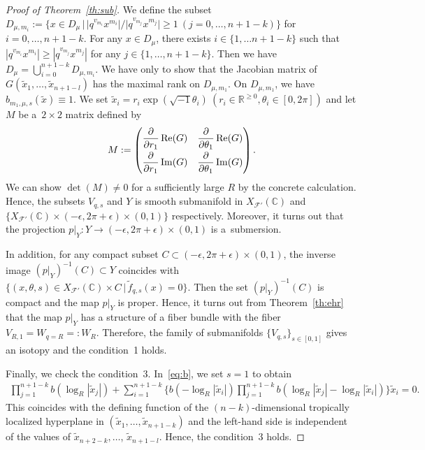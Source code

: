 \documentclass[10pt,a4paper]{amsart}
\numberwithin{equation}{section}
\begin{document}
\begin{proof}[Proof of Theorem~\ref{th:sub}]
We def\/ine the subset $D_{\mu,m_i}:=\{ x \in D_{\mu} \,|\, |q^{v_{m_i}}x^{m_i}|/|q^{v_{m_j}}x^{m_j}| \geq1\ (j=0, \dots, n+1-k) \}$ for $i=0, \dots, n+1-k$. For any $x \in D_\mu$, there exists $i \in \{1, \dots n+1-k\}$ such that $|q^{v_{m_i}}x^{m_i}| \geq |q^{v_{m_j}}x^{m_j}|$ for any $j \in \{1, \dots, n+1-k\}$.
Then we have $D_{\mu} = \bigcup_{i=0}^{n+1-k} D_{\mu,m_i}$. We have only to show that the Jacobian matrix of $G(\tilde{x}_1, \dots, \tilde{x}_{n+1-l})$ has the maximal rank on $D_{\mu,{m_1}}$. On $D_{\mu,{m_1}}$, we have $b_{m_1,\mu,s}(\tilde{x}) \equiv 1$. We set $\tilde{x}_i=r_i\exp(\sqrt{-1} \theta_i)\ (r_i \in {\mathbb R}^{\geq0}, \theta_i \in [0,2\pi])$ and let $M$ be a~$2 \times 2$ matrix def\/ined by
\begin{gather*}
M:=\begin{pmatrix}
\dfrac{\partial}{\partial r_{1}} \operatorname{Re}(G) &\dfrac{\partial}{\partial \theta_{1}} \operatorname{Re}(G)\vspace{1mm}\\
\dfrac{\partial}{\partial r_{1}} \operatorname{Im}(G) &\dfrac{\partial}{\partial \theta_{1}} \operatorname{Im}(G)
\end{pmatrix}.
\end{gather*}
We can show $\det(M) \neq 0$ for a suf\/f\/iciently large $R$ by the concrete calculation. Hence, the subsets $V_{q,s}$ and $Y$ is smooth submanifold in $X_{{\mathcal F}'}({\mathbb C})$ and $\{X_{{\mathcal F}'}({\mathbb C}) \times (-\epsilon, 2\pi+\epsilon) \times (0,1)\}$ respectively. Moreover, it turns out that the projection $p|_Y \colon Y \to (-\epsilon, 2\pi+\epsilon) \times (0,1)$ is a~sub\-mersion.

In addition, for any compact subset $C \subset (-\epsilon, 2\pi+\epsilon) \times (0,1)$, the inverse image $(p|_Y)^{-1}(C) \subset Y$ coincides with $\{(x, \theta, s) \in X_{{\mathcal F}'}({\mathbb C}) \times C \,|\, \tilde{f}_{q,s}(x)=0\}$. Then the set $(p|_Y)^{-1}(C)$ is compact and the map $p|_Y$ is proper.
Hence, it turns out from Theorem~\ref{th:ehr} that the map $p|_Y$ has a structure of a f\/iber bundle with the f\/iber $V_{R,1}=W_{q=R}=:W_R$. Therefore, the family of submanifolds $\{V_{q,s}\}_{s \in [0,1]}$ gives an isotopy and the condition~1 holds.

Finally, we check the condition~3. In~\eqref{eq:b}, we set $s=1$ to obtain
\begin{gather*}
\prod_{j=1}^{n+1-k}b(\log_R|\tilde{x}_j|)+\sum_{i=1}^{n+1-k}\bigg\{b(-\log_R|\tilde{x}_i|) \prod_{j=1}^{n+1-k}b(\log_R|\tilde{x}_j|-\log_R|\tilde{x}_i|) \bigg\}\tilde{x}_i=0.
\end{gather*}
This coincides with the def\/ining function of the $(n-k)$-dimensional tropically localized hyperplane in $(\tilde{x}_1, \dots, \tilde{x}_{n+1-k})$ and the left-hand side is independent of the values of $\tilde{x}_{n+2-k}, \dots$, $\tilde{x}_{n+1-l}$.
Hence, the condition~3 holds.
\end{proof}
\end{document}
